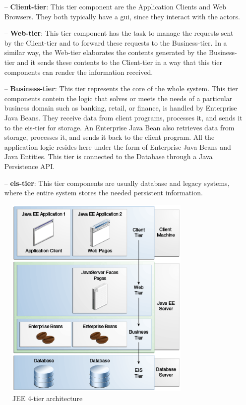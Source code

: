 \begin{itemize}

\item[--]\textbf{Client-tier}: This tier component are the Application Clients and Web Browsers. They both typically have a \acs{gui}, since they interact with the actors.

\item[--]\textbf{Web-tier}: This tier component has the task to manage the requests sent by the Client-tier and to forward these requests to the Business-tier. In a similar way, the Web-tier elaborates the contents generated by the Business-tier and it sends these contents to the Client-tier in a way that this tier components can render the information received.

\item[--]\textbf{Business-tier}: This tier represents the core of the whole system. This tier components contein the logic that solves or meets the needs of a particular business domain such as banking, retail, or finance, is handled by Enterprise Java Beans. They receive data from client programs, processes it, and sends it to the \acs{eis}-tier for storage. An Enterprise Java Bean also retrieves data from storage, processes it, and sends it back to the client program.
All the application logic resides here under the form of Enterprise Java Beans and Java Entities. This tier is connected to the Database through a Java Persistence API.

\item[--]\textbf{\acs{eis}-tier}: This tier components are usually database and legacy systems, where the entire system stores the needed persistent information.

\end{itemize}

\begin{figure}[htbp]
\centering
\includegraphics[width=0.8\textwidth]{Images/jeett_dt_001.png}
\caption{JEE 4-tier architecture}
\label{fig:jeearch}
\end{figure}
\clearpage

